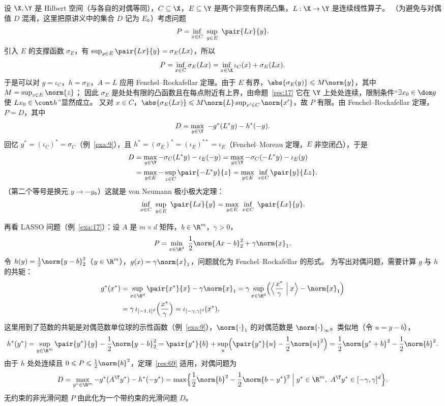 \begin{example}
\label{exa:22}
设 $\X,\Y$ 是 Hilbert 空间（与各自的对偶等同），$C\subseteq\X$，$E\subseteq\Y$ 是两个非空有界闭凸集，$L:\X\to\Y$ 是连续线性算子。
（为避免与对偶值 $D$ 混淆，这里把原讲义中的集合 $D$ 记为 $E$。）考虑问题
\[
  P=\inf_{x\in C}\ \sup_{y\in E}\ \pair{Lx}{y}.
\]
引入 $E$ 的支撑函数 $\sigma_E$，有 $\sup_{y\in E}\pair{Lx}{y}=\sigma_E(Lx)$，所以
\[
  P=\inf_{x\in C}\sigma_E(Lx)=\inf_{x\in\X}\iota_C(x)+\sigma_E(Lx).
\]
于是可以对 $g=\iota_C$，$h=\sigma_E$，$A=L$ 应用 Fenchel--Rockafellar 定理。由于 $E$ 有界，$\abs{\sigma_E(y)}\leqslant M\norm{y}$，其中 $M=\sup_{z\in E}\norm{z}$；
因此 $\sigma_E$ 是处处有限的凸函数且在每点附近有上界，由命题~\ref{res:17} 它在 $\Y$ 上处处连续，限制条件“$\exists x_0\in\dom g$ 使 $Lx_0\in\cont h$”显然成立。
又对 $x\in C$，$\abs{\sigma_E(Lx)}\leqslant M\norm{L}\sup_{x'\in C}\norm{x'}$，故 $P$ 有限。由 Fenchel--Rockafellar 定理，$P=D$，其中
\[
  D=\max_{y\in\Y}\ -g^*(L^*y)-h^*(-y).
\]
回忆 $g^*=(\iota_C)^*=\sigma_C$（例~\ref{exa:9}），且 $h^*=(\sigma_E)^*=(\iota_E)^{**}=\iota_E$（Fenchel--Moreau 定理，$E$ 非空闭凸），于是
\[
  \begin{aligned}
  D&=\max_{y\in\Y}-\sigma_C(L^*y)-\iota_E(-y)
   =\max_{y\in\Y}-\sigma_C(-L^*y)-\iota_E(y)\\
   &=\max_{y\in E}-\sup_{z\in C}\pair{-L^*y}{z}
   =\max_{y\in E}\ \inf_{z\in C}\pair{y}{Lz}.
  \end{aligned}
\]
（第二个等号是换元 $y\to-y$。）这就是 von Neumann 极小极大定理：
\[
  \inf_{x\in C}\ \sup_{y\in E}\ \pair{Lx}{y}=\max_{y\in E}\ \inf_{x\in C}\ \pair{Lx}{y}.
\]
\end{example}

\begin{example}[LASSO]
\label{exa:23}
再看 LASSO 问题（例~\ref{exa:17}）：设 $A$ 是 $m\times d$ 矩阵，$b\in\R^m$，$\gamma>0$，
\[
  P=\min_{x\in\R^d}\ \frac12\norm{Ax-b}_2^2+\gamma\norm{x}_1 .
\]
令 $h(y)=\frac12\norm{y-b}_2^2$（$y\in\R^m$），$g(x)=\gamma\norm{x}_1$，问题就化为 Fenchel--Rockafellar 的形式。
为写出对偶问题，需要计算 $g$ 与 $h$ 的共轭：
\[
  \begin{aligned}
  g^*(x^*)&=\sup_{x\in\R^d}\pair{x^*}{x}-\gamma\norm{x}_1
  =\gamma\sup_{x\in\R^d}\Bigl(\Bigl\langle\frac{x^*}{\gamma}\Bigm|x\Bigr\rangle-\norm{x}_1\Bigr)\\
  &=\gamma\,\iota_{[-1,1]^d}\Bigl(\frac{x^*}{\gamma}\Bigr)=\iota_{[-\gamma,\gamma]^d}(x^*),
  \end{aligned}
\]
这里用到了范数的共轭是对偶范数单位球的示性函数（例~\ref{exa:9}），$\norm{\cdot}_1$ 的对偶范数是 $\norm{\cdot}_\infty$。类似地（令 $u=y-b$），
\[
  h^*(y^*)=\sup_{y\in\R^m}\pair{y^*}{y}-\frac12\norm{y-b}_2^2
  =\pair{y^*}{b}+\sup_{u}\Bigl(\pair{y^*}{u}-\frac12\norm{u}^2\Bigr)
  =\frac12\norm{y^*+b}^2-\frac12\norm{b}^2 .
\]
由于 $h$ 处处连续且 $0\leqslant P\leqslant\frac12\norm{b}^2$，定理~\ref{res:69} 适用，对偶问题为
\[
  D=\max_{y^*\in\R^m}-g^*(A^\T y^*)-h^*(-y^*)
  =\max\Bigl\{\frac12\norm{b}^2-\frac12\norm{b-y^*}^2\Bigm| y^*\in\R^m,\ A^\T y^*\in[-\gamma,\gamma]^d\Bigr\}.
\]
无约束的非光滑问题 $P$ 由此化为一个带约束的光滑问题 $D$。
\end{example}

